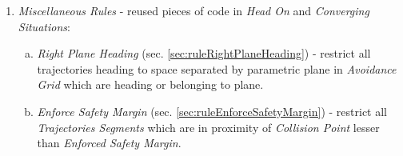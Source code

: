 \begin{enumerate}
    \item \emph{Miscellaneous Rules} - reused pieces of code in \emph{Head On} and \emph{Converging Situations}:
    \begin{enumerate}[a.]
        \item \emph{Right Plane Heading} (sec. \ref{sec:ruleRightPlaneHeading}) - restrict all trajectories heading to space separated by parametric plane in \emph{Avoidance Grid} which are heading or belonging to plane.
        
        \item \emph{Enforce Safety Margin} (sec. \ref{sec:ruleEnforceSafetyMargin}) - restrict all \emph{Trajectories Segments} which are in proximity of \emph{Collision Point} lesser than \emph{Enforced Safety Margin}.
    \end{enumerate}
\end{enumerate}